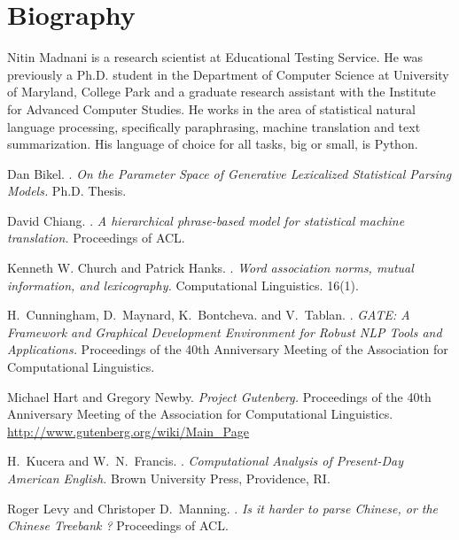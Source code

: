 \documentclass[11pt]{article}
\begin{document}
\section{Biography} %
\label{sec:biography}
Nitin Madnani is a research scientist at Educational Testing Service. He was previously a Ph.D. student in the Department of Computer Science at University of Maryland, College Park and a graduate research assistant with the Institute for Advanced Computer Studies. He works in the area of statistical natural language processing, specifically paraphrasing, machine translation and text summarization. His language of choice for all tasks, big or small, is Python.




\begin{thebibliography}{99}
Dan Bikel.
.
\newblock \emph{On the Parameter Space of Generative Lexicalized Statistical Parsing Models.}
\newblock Ph.D. Thesis.\\

David Chiang.
.
\newblock \emph{A hierarchical phrase-based model for statistical machine translation.}
\newblock Proceedings of ACL.

Kenneth W. Church and Patrick Hanks.
.
\newblock \emph{Word association norms, mutual information, and lexicography.}
\newblock Computational Linguistics. 16(1).

H.~Cunningham, D.~Maynard, K.~Bontcheva. and V.~Tablan.
.
\newblock \emph{GATE: A Framework and Graphical Development Environment for Robust NLP Tools and Applications.}
\newblock Proceedings of the 40th Anniversary Meeting of the Association for Computational Linguistics.

Michael Hart and Gregory Newby.
\newblock \emph{Project Gutenberg.}
\newblock Proceedings of the 40th Anniversary Meeting of the Association for Computational Linguistics.\\
\url{http://www.gutenberg.org/wiki/Main_Page}

H.~Kucera and W.~N.~Francis.
.
\newblock \emph{ Computational Analysis of Present-Day American English.}
\newblock Brown University Press, Providence, RI.

Roger Levy and Christoper D.~Manning.
.
\newblock \emph{Is it harder to parse Chinese, or the Chinese Treebank ?}
\newblock Proceedings of ACL.


\end{thebibliography}
\end{document}
